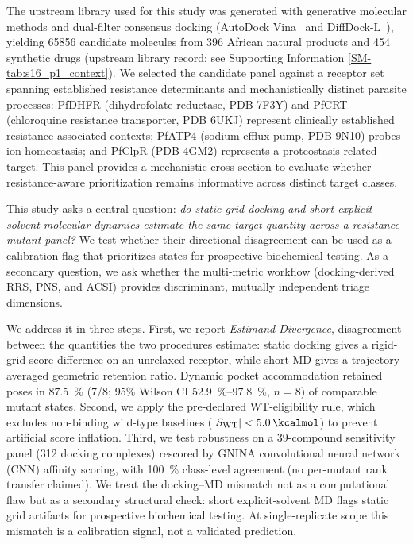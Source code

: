 \documentclass[11pt,a4paper]{article}
\begin{document}
The upstream library used for this study was generated with generative molecular methods and dual-filter consensus docking (AutoDock Vina~\citep{vina_2021} and DiffDock-L~\citep{diffdock_2023}), yielding \num{65856} candidate molecules from 396 African natural products and 454 synthetic drugs (upstream library record; see Supporting Information \cref{SM-tab:s16_p1_context}). We selected the candidate panel against a receptor set spanning established resistance determinants and mechanistically distinct parasite processes: PfDHFR (dihydrofolate reductase, PDB 7F3Y) and PfCRT (chloroquine resistance transporter, PDB 6UKJ) represent clinically established resistance-associated contexts; PfATP4 (sodium efflux pump, PDB 9N10) probes ion homeostasis; and PfClpR (PDB 4GM2) represents a proteostasis-related target. This panel provides a mechanistic cross-section to evaluate whether resistance-aware prioritization remains informative across distinct target classes.

This study asks a central question: \textit{do static grid docking and short explicit-solvent molecular dynamics estimate the same target quantity across a resistance-mutant panel?} We test whether their directional disagreement can be used as a calibration flag that prioritizes states for prospective biochemical testing. As a secondary question, we ask whether the multi-metric workflow (docking-derived RRS, PNS, and ACSI) provides discriminant, mutually independent triage dimensions.

We address it in three steps. First, we report \emph{Estimand Divergence}, disagreement between the quantities the two procedures estimate\citep{lundberg2021estimand}: static docking gives a rigid-grid score difference on an unrelaxed receptor, while short MD gives a trajectory-averaged geometric retention ratio. Dynamic pocket accommodation retained poses in \qty{87.5}{\percent} (7/8; 95\% Wilson CI \qtyrange{52.9}{97.8}{\percent}, $n=\num{8}$) of comparable mutant states. Second, we apply the pre-declared WT-eligibility rule, which excludes non-binding wild-type baselines ($|S_{\mathrm{WT}}| < \qty{5.0}{\kcalmol}$) to prevent artificial score inflation. Third, we test robustness on a 39-compound sensitivity panel (\num{312} docking complexes) rescored by GNINA convolutional neural network (CNN) affinity scoring, with \qty{100}{\percent} class-level agreement (no per-mutant rank transfer claimed). We treat the docking--MD mismatch not as a computational flaw but as a secondary structural check: short explicit-solvent MD flags static grid artifacts for prospective biochemical testing. At single-replicate scope this mismatch is a calibration signal, not a validated prediction.
\end{document}
